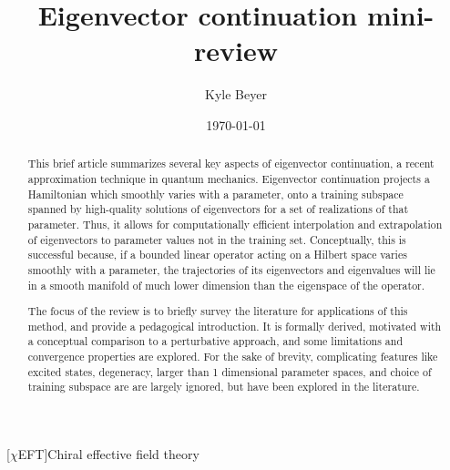 \documentclass[%
 reprint,
 amsmath,amssymb,
 aps,
]{revtex4-2}
\begin{document}

\title{Eigenvector continuation mini-review}%

\author{Kyle Beyer}
%




\date{\today}%

\begin{abstract}
  This brief article summarizes several key aspects of eigenvector continuation, a recent approximation technique in quantum mechanics. Eigenvector continuation projects a Hamiltonian which smoothly varies with a parameter, onto a training subspace spanned by high-quality solutions of eigenvectors for a set of realizations of that parameter. Thus, it allows for computationally efficient interpolation and extrapolation of eigenvectors to parameter values not in the
  training set. Conceptually, this is successful because, if a bounded linear operator acting on a Hilbert space varies smoothly with a parameter, the trajectories of its eigenvectors and eigenvalues will lie in a smooth manifold of much lower dimension than the eigenspace of the operator. 

  The focus of the review is to briefly survey the literature for applications of this method, and provide a pedagogical introduction. It is formally derived, motivated with a conceptual comparison to a perturbative approach, and some limitations and convergence properties are explored. For the sake of brevity, complicating features like
  excited states, degeneracy, larger than 1 dimensional parameter spaces, and choice of training subspace are are largely ignored, but have been explored in the literature.
\end{abstract}

\maketitle



\begin{acronym}
  [$\chi$EFT]{Chiral effective field theory}
\end{acronym}
\end{document}

